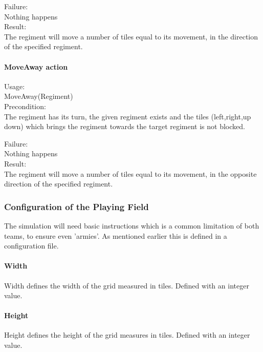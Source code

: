 		Failure: \\
		Nothing happens \\
		
		Result: \\
		The regiment will move a number of tiles equal to its movement, in the direction of the specified regiment.
		
		\paragraph{MoveAway action}
		Usage: \\
		MoveAway(Regiment) \\
		
		Precondition: \\
		The regiment has its turn, the given regiment exists and the tiles (left,right,up down) 
		which brings the regiment towards the target regiment is not blocked.
		
		Failure: \\
		Nothing happens \\
		
		Result: \\
		The regiment will move a number of tiles equal to its movement, in the opposite direction of the specified regiment.
				
		\subsubsection{Configuration of the Playing Field}
		The simulation will need basic instructions which is a common limitation of both teams, to ensure even 'armies'. 
		As mentioned earlier this is defined in a configuration file.
		
		\paragraph{Width}
		Width defines the width of the grid measured in tiles.
		Defined with an integer value.
		
		\paragraph{Height}
		Height defines the height of the grid measures in tiles.
		Defined with an integer value.
		
